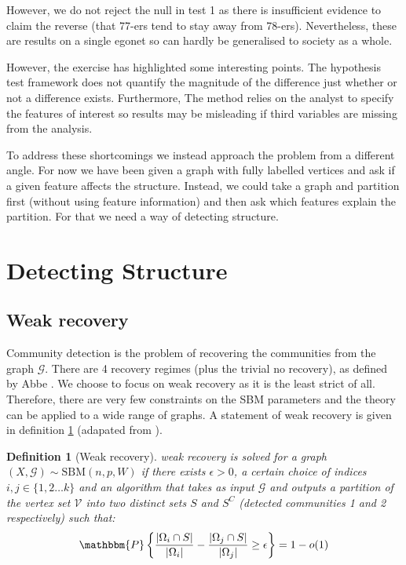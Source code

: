 \documentclass[11pt]{article}
\newcommand{\Gcal}{\mathcal{G}}
\newcommand{\Vcal}{\mathcal{V}}
\newcommand{\prob}{\mathbbm{P}}
\newtheorem{definition}{Definition}[section]
\begin{document}
\begin{multicols*}{2}
However, we do not reject the null in test 1 as there is insufficient evidence to claim the reverse (that 77-ers tend to stay away from 78-ers). Nevertheless, these are results on a single egonet so can hardly be generalised to society as a whole.

However, the exercise has highlighted some interesting points. The hypothesis test framework does not quantify the magnitude of the difference just whether or not a difference exists. Furthermore, The method relies on the analyst to specify the features of interest so results may be misleading if third variables are missing from the analysis.

To address these shortcomings we instead approach the problem from a different angle. For now we have been given a graph with fully labelled vertices and ask if a given feature affects the structure. Instead, we could take a graph and partition first (without using feature information) and then ask which features explain the partition. For that we need a way of detecting structure.

\section{Detecting Structure}
\subsection{Weak recovery}

Community detection is the problem of recovering the communities from the graph $\Gcal$. There are 4 recovery regimes (plus the trivial no recovery), as defined by Abbe \cite{Abbe}. We choose to focus on weak recovery as it is the least strict of all. Therefore, there are very few constraints on the SBM parameters and the theory can be applied to a wide range of graphs. A statement of weak recovery is given in definition \ref{defn:weak-recovery} (adapated from \cite{Abbe}).

\begin{definition}[Weak recovery]
	\label{defn:weak-recovery}
	weak recovery is solved for a graph  $(X, \Gcal) \sim \textrm{SBM}(n, p, W)$ if there exists $\epsilon > 0$, a certain choice of indices $i, j \in \{1, 2 \dots k\}$ and an algorithm that takes as input $\Gcal$ and outputs a partition of the vertex set $\Vcal$ into two distinct sets $S$ and $S^C$ (detected communities 1 and 2 respectively) such that:
	\begin{equation*}
		\prob \left\{ \frac{|\Omega_i \cap S|}{|\Omega_i|} - \frac{|\Omega_j \cap S|}{|\Omega_j|} \geq \epsilon \right\} = 1 - o(1)
	\end{equation*}


\end{definition}
\end{multicols*}
\end{document}
